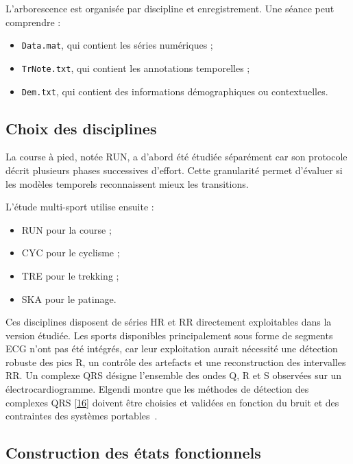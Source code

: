 \documentclass[12pt,a4paper]{article}
\newcommand{\openaccessref}[2]{%
  \nobreak\hspace{0.08em}%
  \href{#2}{\textcolor{green!35!black}{[#1]}}%
}
\begin{document}
L'arborescence est organisée par discipline et enregistrement. Une séance peut
comprendre :

\begin{itemize}[leftmargin=1.5em]
  \item \texttt{Data.mat}, qui contient les séries numériques ;
  \item \texttt{TrNote.txt}, qui contient les annotations temporelles ;
  \item \texttt{Dem.txt}, qui contient des informations démographiques ou
  contextuelles.
\end{itemize}

\subsection{Choix des disciplines}

La course à pied, notée RUN, a d'abord été étudiée séparément car son protocole
décrit plusieurs phases successives d'effort. Cette granularité permet
d'évaluer si les modèles temporels reconnaissent mieux les transitions.

L'étude multi-sport utilise ensuite :

\begin{itemize}[leftmargin=1.5em]
  \item RUN pour la course ;
  \item CYC pour le cyclisme ;
  \item TRE pour le trekking ;
  \item SKA pour le patinage.
\end{itemize}

Ces disciplines disposent de séries HR et RR directement exploitables dans la
version étudiée. Les sports disponibles principalement sous forme de segments
ECG n'ont pas été intégrés, car leur exploitation aurait nécessité une
détection robuste des pics R, un contrôle des artefacts et une reconstruction
des intervalles RR. Un complexe QRS désigne l'ensemble des ondes Q, R et S
observées sur un électrocardiogramme. Elgendi montre que les méthodes de
détection des complexes QRS\openaccessref{16}{https://journals.plos.org/plosone/article?id=10.1371/journal.pone.0084018} doivent être choisies et validées en fonction du bruit et des contraintes
des systèmes portables~\cite{elgendi2014}.

\subsection{Construction des états fonctionnels}
\end{document}
